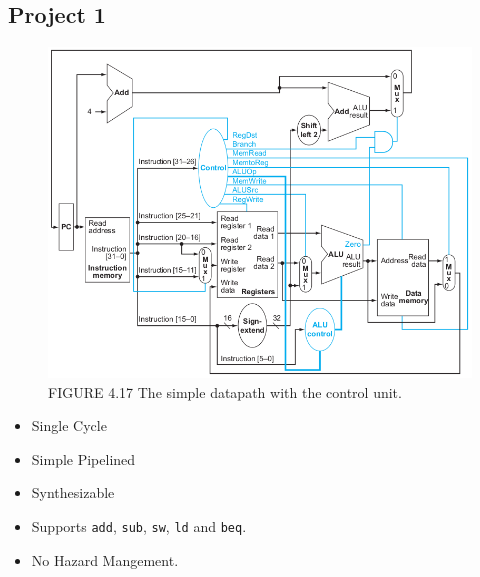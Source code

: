 \documentclass{article}
\begin{document}
\subsection*{Project 1}
\begin{figure}[H]
    \begin{center}
        \includegraphics[scale=0.5]{PipelinedImplementation1/Implementation1_pro1.png}
        \caption*{FIGURE 4.17 The simple datapath with the control unit.}
    \end{center}
\end{figure}

\begin{itemize}
    \item Single Cycle
    \item Simple Pipelined
    \item Synthesizable
    \item Supports \verb|add|, \verb|sub|, \verb|sw|, \verb|ld| and \verb|beq|.
    \item No Hazard Mangement.
\end{itemize}
\end{document}
